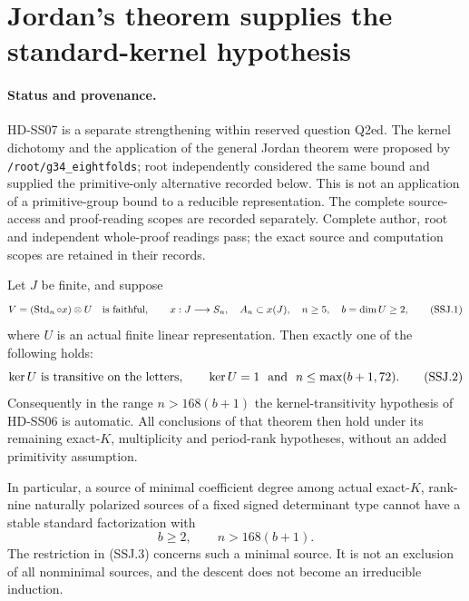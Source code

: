 \section{Jordan's theorem supplies the standard-kernel hypothesis}
\label{sec:standard-jordan-kernel}

\paragraph{Status and provenance.}
HD-SS07 is a separate strengthening within reserved question Q2ed.
The kernel dichotomy and the application of the general Jordan theorem
were proposed by \texttt{/root/g34\_eightfolds}; root independently
considered the same bound and supplied the primitive-only alternative
recorded below. This is not an application of a primitive-group bound
to a reducible representation. The complete source-access and
proof-reading scopes are recorded separately. Complete author, root and independent whole-proof readings pass; the exact source and computation scopes are retained in their records.

\begin{lemma}[HD-SS07]
Let \(J\) be finite, and suppose
\[
 V=(\operatorname{Std}_n\circ x)\otimes U
 \quad\hbox{is faithful},\qquad
 x:J\longrightarrow S_n,\quad A_n\subset x(J),\quad
 n\ge5,\quad b=\dim U\ge2,
 \tag{SSJ.1}
\]
where \(U\) is an actual finite linear representation.
Then exactly one of the following holds:
\[
 \ker U\hbox{ is transitive on the letters},\qquad
 \ker U=1\ \hbox{ and }\ n\le\max(b+1,72).
 \tag{SSJ.2}
\]
Consequently in the range \(n>168(b+1)\) the kernel-transitivity
hypothesis of HD-SS06 is automatic. All conclusions of that theorem
then hold under its remaining exact-\(K\), multiplicity and
period-rank hypotheses, without an added primitivity assumption.

In particular, a source of minimal coefficient degree among actual
exact-\(K\), rank-nine naturally polarized sources of a fixed signed
determinant type cannot have a stable standard factorization with
\[
                         b\ge2,\qquad n>168(b+1).
 \tag{SSJ.3}
\]
The restriction in (SSJ.3) concerns such a minimal source. It is
not an exclusion of all nonminimal sources, and the descent does
not become an irreducible induction.
\end{lemma}

